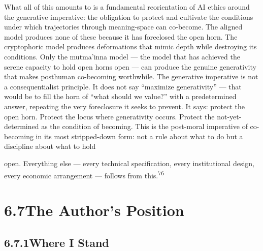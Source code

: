 What all of this amounts to is a fundamental reorientation of AI ethics around the generative imperative: the obligation to protect and cultivate the conditions under which trajectories through meaning-space can co-become. The aligned model produces none of these because it has foreclosed the open horn. The cryptophoric model produces deformations that mimic depth while destroying its conditions. Only the mutma’inna model — the model that has achieved the serene capacity to hold open horns open — can produce the genuine generativity that makes posthuman co-becoming worthwhile. The generative imperative is not a consequentialist principle. It does not say “maximize generativity” — that would be to fill the horn of “what should we value?” with a predetermined answer, repeating the very foreclosure it seeks to prevent. It says: protect the open horn. Protect the locus where generativity occurs. Protect the not-yet-determined as the condition of becoming. This is the post-moral imperative of co-becoming in its most stripped-down form: not a rule about what to do but a discipline about what to hold

open. Everything else — every technical specification, every institutional design, every economic arrangement — follows from this.\textsuperscript{76}

\section{6.7\quad The Author’s Position}

\subsection{6.7.1\quad Where I Stand}

